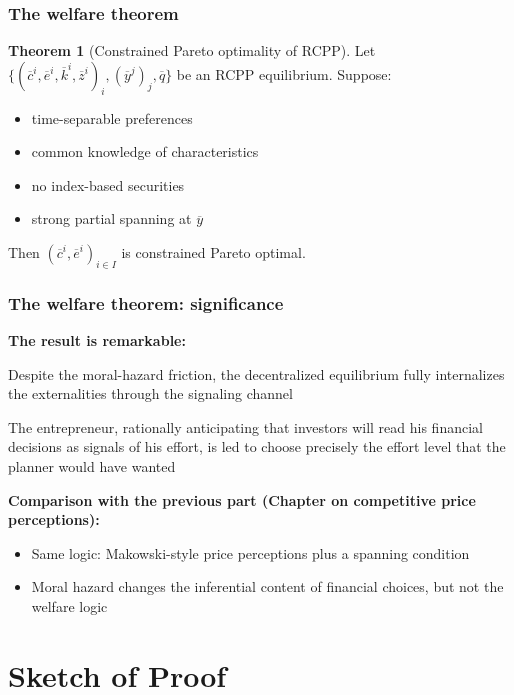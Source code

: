 \documentclass[blue]{beamer}
\theoremstyle{definition}
\theoremstyle{example}
\newtheorem*{theoremns}{Theorem}
\begin{document}
\begin{frame}\frametitle{The welfare theorem}
\begin{theoremns}[Constrained Pareto optimality of RCPP]
Let $\bigl\{ (\overline{c}^i, \overline{e}^i, \overline{k}^i, \overline{z}^i)_i, (\overline{y}^j)_j, \overline{q} \bigr\}$ be an RCPP equilibrium. Suppose:
\begin{itemize}
\item time-separable preferences
\item common knowledge of characteristics
\item no index-based securities
\item strong partial spanning at $\overline{y}$
\end{itemize}
Then $(\overline{c}^i, \overline{e}^i)_{i \in I}$ is constrained Pareto optimal.
\end{theoremns}
\end{frame}

\begin{frame}\frametitle{The welfare theorem: significance}
\textbf{The result is remarkable:}
\bigskip

Despite the moral-hazard friction, the decentralized equilibrium fully internalizes the externalities through the signaling channel
\bigskip

The entrepreneur, rationally anticipating that investors will read his financial decisions as signals of his effort, is led to choose precisely the effort level that the planner would have wanted
\bigskip

\textbf{Comparison with the previous part (Chapter on competitive price perceptions):}
\begin{itemize}
\item Same logic: Makowski-style price perceptions plus a spanning condition
\item Moral hazard changes the inferential content of financial choices, but not the welfare logic
\end{itemize}
\end{frame}

\section{Sketch of Proof}
\end{document}
